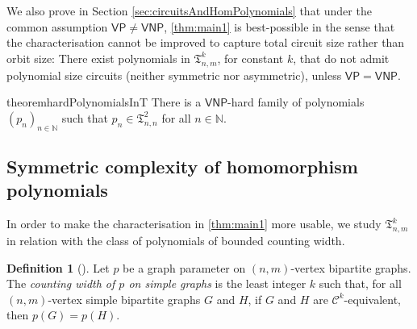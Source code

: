 \documentclass[10pt,a4paper]{article}
\theoremstyle{definition}
\newtheorem{definition}{Definition}[section]
\theoremstyle{plain}
\theoremstyle{remark}
\newcommand{\bbN}{\mathbb{N}}
\newcommand{\VP}{\mathsf{VP}}
\newcommand{\VNP}{\mathsf{VNP}}
\begin{document}
We also prove in Section \ref{sec:circuitsAndHomPolynomials} that under the common assumption $\VP \neq \VNP$,
\cref{thm:main1} is best-possible in the sense that the
characterisation cannot be improved to capture total circuit size
rather than orbit size: There exist polynomials in
$\mathfrak{T}_{n,m}^k$, for constant $k$, that do not admit polynomial
size circuits (neither symmetric nor asymmetric), unless $\VP =
\VNP$. 
\begin{restatable}{theorem}{hardPolynomialsInT}\label{thm:hardPolynomialsInT}
	There is a $\VNP$-hard family of polynomials $(p_{n})_{n \in \bbN}$ such that $p_{n} \in \mathfrak{T}_{n,n}^2$ for all $n \in \mathbb{N}$.
\end{restatable}	

\subsection{Symmetric complexity of homomorphism polynomials}

In order to make the characterisation in \cref{thm:main1} more usable, we study $\mathfrak{T}^k_{n,m}$ in relation with the class of polynomials of bounded counting width.

\begin{definition}[\cite{anderson_symmetric_2017}]
	Let $p$ be a graph parameter on $(n,m)$-vertex bipartite graphs.
	The \emph{counting width of $p$ on simple graphs} is the least integer $k$ such that, for all $(n,m)$-vertex simple bipartite graphs $G$ and $H$, if $G$ and $H$ are $\mathcal{C}^k$-equivalent, then $p(G) = p(H)$.
\end{definition}

%
%
\end{document}
